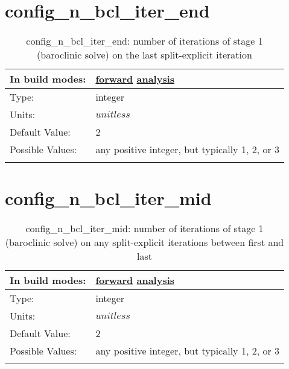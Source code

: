 \section[config\_n\_bcl\_iter\_end]{config\_n\_bcl\_iter\_end}
\label{sec:nm_sec_config_n_bcl_iter_end}
\begin{center}
\begin{longtable}{| p{2.0in} || p{4.0in} |}
    \hline
    In build modes: & \hyperref[subsec:forward_nm_tab_split_explicit_ts]{forward} \hyperref[subsec:analysis_nm_tab_split_explicit_ts]{analysis} \\
    \hline
    Type: & integer \\
    \hline
    Units: & $unitless$ \\
    \hline
    Default Value: & 2 \\
    \hline
    Possible Values: & any positive integer, but typically 1, 2, or 3 \\
    \hline
    \caption{config\_n\_bcl\_iter\_end: number of iterations of stage 1 (baroclinic solve) on the last split-explicit iteration}
\end{longtable}
\end{center}
\section[config\_n\_bcl\_iter\_mid]{config\_n\_bcl\_iter\_mid}
\label{sec:nm_sec_config_n_bcl_iter_mid}
\begin{center}
\begin{longtable}{| p{2.0in} || p{4.0in} |}
    \hline
    In build modes: & \hyperref[subsec:forward_nm_tab_split_explicit_ts]{forward} \hyperref[subsec:analysis_nm_tab_split_explicit_ts]{analysis} \\
    \hline
    Type: & integer \\
    \hline
    Units: & $unitless$ \\
    \hline
    Default Value: & 2 \\
    \hline
    Possible Values: & any positive integer, but typically 1, 2, or 3 \\
    \hline
    \caption{config\_n\_bcl\_iter\_mid: number of iterations of stage 1 (baroclinic solve) on any split-explicit iterations between first and last}
\end{longtable}
\end{center}
